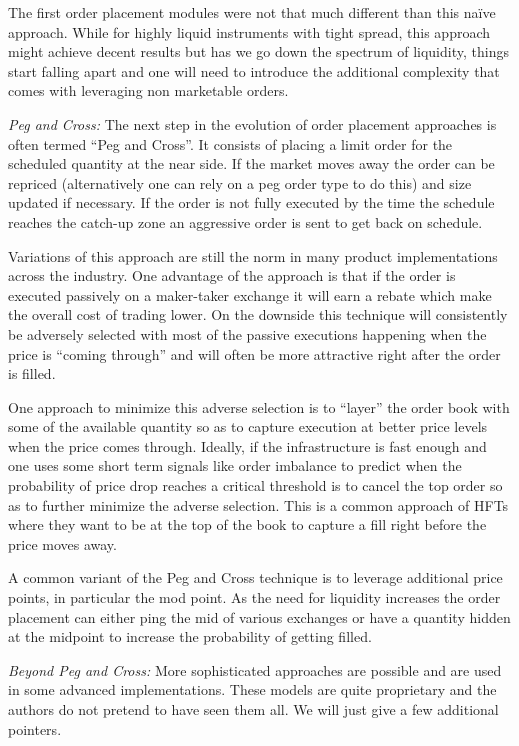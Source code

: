 The first order placement modules were not that much different than this na\"ive approach. While for highly liquid instruments with tight spread, this approach might achieve decent results but has we go down the spectrum of liquidity, things start falling apart and one will need to introduce the additional complexity that comes with leveraging non marketable orders. \twomedskip


\noindent\emph{Peg and Cross:} The next step in the evolution of order placement approaches is often termed ``Peg and Cross''. It consists of placing a limit order  for the scheduled quantity at the near side. If the market moves away the order can be repriced (alternatively one can rely on a peg order type to do this) and size updated if necessary. If the order is not fully executed by the time the schedule reaches the catch-up zone an aggressive order is sent to get back on schedule.


Variations of this approach are still the norm in many product implementations across the industry. One advantage of the approach is that if  the order is executed passively on a maker-taker exchange it will earn a rebate which make the overall cost of trading lower. On the downside this technique will consistently be adversely selected with most of the passive executions happening when the price is ``coming through'' and will often be more attractive right after the order is filled.


One approach to minimize this adverse selection is to ``layer'' the order book with some of the available quantity so as to capture execution at better price levels when the price comes through. Ideally, if the infrastructure is fast enough and one uses some short term signals like order imbalance to predict when the probability of price drop reaches a critical threshold is to cancel the top order so as to further minimize the adverse selection. This is a common approach of HFTs where they want to be at the top of the book to capture a fill right before the price moves away.


A common variant of the Peg and Cross technique is to leverage additional price points, in particular the mod point. As the need for liquidity increases the order placement can either ping the mid of various exchanges or have a quantity hidden at the midpoint to increase the probability of getting filled. \twomedskip


\noindent\emph{Beyond Peg and Cross:} More sophisticated approaches are possible and are used in some advanced implementations. These models are quite proprietary and the authors do not pretend to have seen them all. We will just give a few additional pointers.


